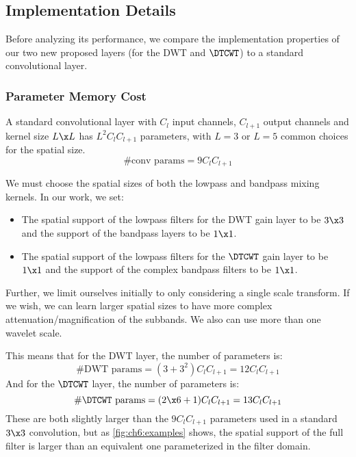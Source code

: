 \subsection{Implementation Details}

Before analyzing its performance, we compare the implementation properties of
our two new proposed layers (for the DWT and $\DTCWT$) to a standard
convolutional layer.

\subsubsection{Parameter Memory Cost}\label{sec:ch6:memory}
A standard convolutional layer with $C_l$ input channels, $C_{l+1}$ output channels
and kernel size $L\x L$ has $L^2C_{l}C_{l+1}$ parameters, with $L=3$ or $L=5$
common choices for the spatial size.
\begin{equation}
  \text{\#conv params} = 9C_lC_{l+1}
\end{equation}

We must choose the spatial sizes of both the lowpass and bandpass
mixing kernels. In our work, we set:
%
\begin{itemize}
  \item The spatial support of the lowpass filters for the DWT gain 
    layer to be $3\x 3$ and the support of the bandpass layers to be $1\x 1$.
  \item The spatial support of the lowpass filters for the $\DTCWT$ gain layer to
    be $1\x 1$ and the support of the complex bandpass filters to be $1\x 1$.
\end{itemize}
%
Further, we limit ourselves initially to only considering a single scale
transform.  If we wish, we can learn larger spatial sizes to have more complex
attenuation/magnification of the subbands. We also can use more than one wavelet
scale. 

This means that for the DWT layer, the number of parameters is:
%
\begin{equation}
  \text{\#DWT params} = (3 + 3^2)C_lC_{l+1} = 12C_lC_{l+1} \label{eq:ch6:memcost1}
\end{equation} 
%
And for the $\DTCWT$ layer, the number of parameters is:
\begin{equation}
  \text{\#$\DTCWT$ params} = (2\x 6 + 1)C_lC_{l+1} = 13C_lC_{l+1} \label{eq:ch6:memcost2}
\end{equation} 
%
These are both slightly larger than the $9C_lC_{l+1}$ parameters used in a
standard $3\x 3$ convolution, but as \autoref{fig:ch6:examples} shows, the
spatial support of the full filter is larger than an equivalent one
parameterized in the filter domain. 

